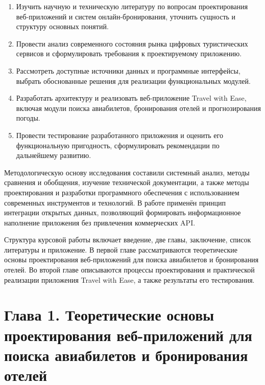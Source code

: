 \documentclass[14pt,a4paper,oneside]{extreport}
\begin{document}
\begin{enumerate}

  \item Изучить научную и техническую литературу по вопросам проектирования веб-приложений и систем онлайн-бронирования, уточнить сущность и структуру основных понятий.

  \item Провести анализ современного состояния рынка цифровых туристических сервисов и сформулировать требования к проектируемому приложению.

  \item Рассмотреть доступные источники данных и программные интерфейсы, выбрать обоснованные решения для реализации функциональных модулей.

  \item Разработать архитектуру и реализовать веб-приложение Travel with Ease, включая модули поиска авиабилетов, бронирования отелей и прогнозирования погоды.

  \item Провести тестирование разработанного приложения и оценить его функциональную пригодность, сформулировать рекомендации по дальнейшему развитию.

\end{enumerate}

Методологическую основу исследования составили системный анализ, методы сравнения и обобщения, изучение технической документации, а также методы проектирования и разработки программного обеспечения с использованием современных инструментов и технологий. В работе применён принцип интеграции открытых данных, позволяющий формировать информационное наполнение приложения без привлечения коммерческих API.

Структура курсовой работы включает введение, две главы, заключение, список литературы и приложение. В первой главе рассматриваются теоретические основы проектирования веб-приложений для поиска авиабилетов и бронирования отелей. Во второй главе описываются процессы проектирования и практической реализации приложения Travel with Ease, а также результаты его тестирования.


\chapter*{Глава 1. Теоретические основы проектирования веб-приложений для поиска авиабилетов и бронирования отелей}
\end{document}
